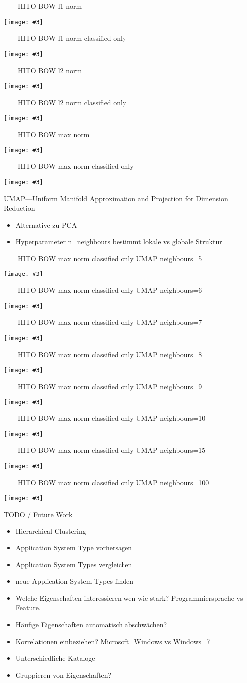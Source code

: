 \documentclass[aspectratio=1610,handout]{beamer}
\newcommand{\imageslide}[4][]
{
\begin{frame}[plain]{~~~~#2}
\vspace{0.2em}
\begin{center}
\centering\texttt{[image: \#3]}
\end{center}
#1
\note{#4}
\end{frame}
}
\begin{document}
\imageslide{HITO BOW l1 norm}{img/cluster-bagofwords-l1.pdf}{}
\imageslide{HITO BOW l1 norm classified only}{img/cluster-bagofwords-classifiedonly-l1.pdf}{}
\imageslide{HITO BOW l2 norm}{img/cluster-bagofwords-l2.pdf}{}
\imageslide{HITO BOW l2 norm classified only}{img/cluster-bagofwords-classifiedonly-l2.pdf}{}
\imageslide{HITO BOW max norm}{img/cluster-bagofwords-max.pdf}{}
\imageslide{HITO BOW max norm classified only}{img/cluster-bagofwords-classifiedonly-max.pdf}{}

\begin{frame}{UMAP---Uniform Manifold Approximation and Projection for Dimension Reduction}
\begin{itemize}
\item Alternative zu PCA
\item Hyperparameter n\_neighbours bestimmt lokale vs globale Struktur
\end{itemize}
\end{frame}

\imageslide{HITO BOW max norm classified only UMAP neighbours=5}{img/cluster-bagofwords-classifiedonly-umap-n5-max.pdf}{}
\imageslide{HITO BOW max norm classified only UMAP neighbours=6}{img/cluster-bagofwords-classifiedonly-umap-n6-max.pdf}{}
\imageslide{HITO BOW max norm classified only UMAP neighbours=7}{img/cluster-bagofwords-classifiedonly-umap-n7-max.pdf}{}
\imageslide{HITO BOW max norm classified only UMAP neighbours=8}{img/cluster-bagofwords-classifiedonly-umap-n8-max.pdf}{}
\imageslide{HITO BOW max norm classified only UMAP neighbours=9}{img/cluster-bagofwords-classifiedonly-umap-n9-max.pdf}{}
\imageslide{HITO BOW max norm classified only UMAP neighbours=10}{img/cluster-bagofwords-classifiedonly-umap-n10-max.pdf}{}
\imageslide{HITO BOW max norm classified only UMAP neighbours=15}{img/cluster-bagofwords-classifiedonly-umap-max.pdf}{}
\imageslide{HITO BOW max norm classified only UMAP neighbours=100}{img/cluster-bagofwords-classifiedonly-umap-n100-max.pdf}{}

\begin{frame}{TODO / Future Work}
\begin{itemize}
\item Hierarchical Clustering
\item Application System Type vorhersagen
\item Application System Types vergleichen
\item neue Application System Types finden
\pause
\vspace{1em}
\item Welche Eigenschaften interessieren wen wie stark? Programmiersprache vs Feature.
\pause
\item Häufige Eigenschaften automatisch abschwächen?
\pause
\item Korrelationen einbeziehen? Microsoft\_Windows vs Windows\_7
\pause
\item Unterschiedliche Kataloge
\pause
\item Gruppieren von Eigenschaften?
\end{itemize}
\end{frame}
\end{document}
